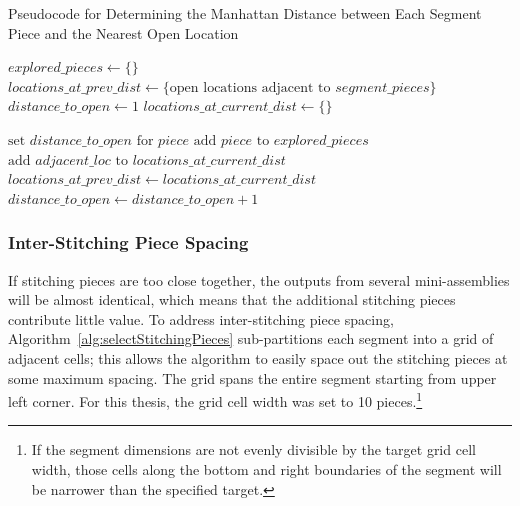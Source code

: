 \begin{algorithm}[t]
\caption{Pseudocode for Determining the Manhattan Distance between Each Segment Piece and the Nearest Open Location}\label{alg:findDistanceToOpen}
\begin{algorithmic}[1]
    \State $explored\_pieces \gets \{ \}$
    \State $locations\_at\_prev\_dist \gets \{ \text{open locations adjacent to } segment\_pieces \}$
    \State $distance\_to\_open \gets 1$
     \label{op:distanceRoundWhileLoop}
        \State $locations\_at\_current\_dist \gets \{ \}$
        		
        			\State $\text{set } distance\_to\_open \text{ for } piece$
        			\State $\text{add } piece \text{ to } explored\_pieces$
        			\State $\text{add } adjacent\_loc \text{ to } locations\_at\_current\_dist$
        		\EndIf
        	\EndFor
        \EndFor
    \State $locations\_at\_prev\_dist \gets locations\_at\_current\_dist$
    \State $distance\_to\_open \gets distance\_to\_open + 1$
    \EndWhile
\EndProcedure
\end{algorithmic}
\end{algorithm}


\subsubsection{Inter-Stitching Piece Spacing}\label{sec:spacingBetweenStitchingPieces}

If stitching pieces are too close together, the outputs from several mini-assemblies will be almost identical, which means that the additional stitching pieces contribute little value.  To address inter-stitching piece spacing, Algorithm~\ref{alg:selectStitchingPieces} sub-partitions each segment into a grid of adjacent cells; this allows the algorithm to easily space out the stitching pieces at some maximum spacing.  The grid spans the entire segment starting from upper left corner.  For this thesis, the grid cell width was set to 10 pieces.\footnote{If the segment dimensions are not evenly divisible by the target grid cell width, those cells along the bottom and right boundaries of the segment will be narrower than the specified target.} 

